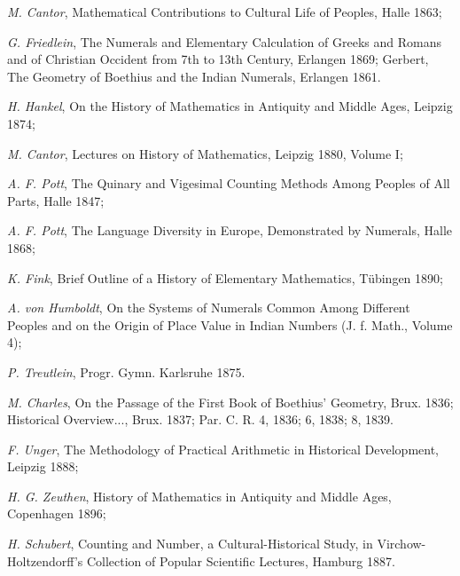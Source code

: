 \vfill
\leftline{\rule{2in}{0.4pt}}
\vspace{0.2cm}
{
\footnotesize
\textit{M. Cantor}, Mathematical Contributions to Cultural Life of Peoples, Halle 1863;

\textit{G. Friedlein}, The Numerals and Elementary Calculation of Greeks and Romans and of Christian Occident from 7th to 13th Century, Erlangen 1869; Gerbert, The Geometry of Boethius and the Indian Numerals, Erlangen 1861.

\textit{H. Hankel}, On the History of Mathematics in Antiquity and Middle Ages, Leipzig 1874;

\textit{M. Cantor}, Lectures on History of Mathematics, Leipzig 1880, Volume I;

\textit{A. F. Pott}, The Quinary and Vigesimal Counting Methods Among Peoples of All Parts, Halle 1847;

\textit{A. F. Pott}, The Language Diversity in Europe, Demonstrated by Numerals, Halle 1868;

\textit{K. Fink}, Brief Outline of a History of Elementary Mathematics, Tübingen 1890;

\textit{A. von Humboldt}, On the Systems of Numerals Common Among Different Peoples and on the Origin of Place Value in Indian Numbers (J. f. Math., Volume 4);

\textit{P. Treutlein}, Progr. Gymn. Karlsruhe 1875.

\textit{M. Charles}, On the Passage of the First Book of Boethius' Geometry, Brux. 1836; Historical Overview..., Brux. 1837; Par. C. R. 4, 1836; 6, 1838; 8, 1839.

\textit{F. Unger}, The Methodology of Practical Arithmetic in Historical Development, Leipzig 1888;

\textit{H. G. Zeuthen}, History of Mathematics in Antiquity and Middle Ages, Copenhagen 1896;

\textit{H. Schubert}, Counting and Number, a Cultural-Historical Study, in Virchow-Holtzendorff's Collection of Popular Scientific Lectures, Hamburg 1887.

}
